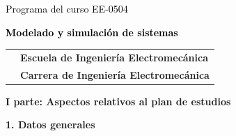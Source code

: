 \documentclass[letterpaper]{article}%
\begin{document}
%
\normalsize%
\thispagestyle{empty}%
%
\vspace*{100mm}%
\par\fontsize{14}{0}\selectfont \textcolor{black}{Programa del curso EE{-}0504}%
\par\fontsize{18}{25}\selectfont \textbf{\textcolor{black}{Modelado y simulación de sistemas}}%
\vspace*{15mm}%
\newline%
\begin{tabularx}{\textwidth}{m{}m{}}%
&\hspace*{0mm}\fontsize{12}{0}\selectfont \textbf{\textcolor{gris}{Escuela de Ingeniería Electromecánica}}\\%
[-12pt]%
&\hspace*{0mm}\fontsize{12}{0}\selectfont \textbf{\textcolor{gris}{Carrera de Ingeniería Electromecánica}}\\%
\end{tabularx}%
\newpage%
\pagestyle{headfoot}%
\par\fontsize{14}{0}\selectfont \textbf{\textcolor{parte}{I parte: Aspectos relativos al plan de estudios}}%
\par\hspace*{2mm}\fontsize{12}{14}\selectfont \textbf{\textcolor{parte}{1. Datos generales}}%
\vspace*{3mm}%
\newline%
\fontsize{10}{12}\selectfont %
\end{document}
